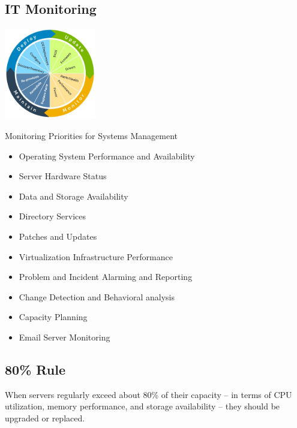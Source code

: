 \documentclass[a4]{article}
\begin{document}
\begin{multicols}{3}
\section{IT Monitoring}
\begin{center}
    \includegraphics[width=4cm]{dell-lc-management.jpg}
\end{center}
Monitoring Priorities for Systems Management
\begin{itemize}
    \item Operating System Performance and Availability
    \item Server Hardware Status
    \item Data and Storage Availability
    \item Directory Services
    \item Patches and Updates
    \item Virtualization Infrastructure Performance
    \item Problem and Incident Alarming and Reporting
    \item Change Detection and Behavioral analysis
    \item Capacity Planning
    \item Email Server Monitoring
\end{itemize}

\subsection{80\% Rule}
When servers regularly exceed about 80\% of their capacity – in terms of CPU utilization, memory performance, 
and storage availability – they should be upgraded or replaced. 


\end{multicols}
\end{document}
